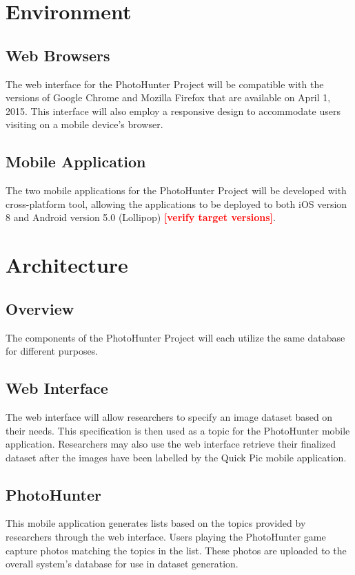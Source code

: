 \documentclass{article}
\newcommand{\todo}[1]{\textcolor{red}{\textbf{[#1]}}}
\begin{document}
\section{Environment}

\subsection{Web Browsers}
The web interface for the PhotoHunter Project will be compatible with the
versions of Google Chrome and Mozilla Firefox that are available on
April 1, 2015. This interface will also employ a
responsive design to accommodate users visiting on a mobile device's browser.

\subsection{Mobile Application}
The two mobile applications for the PhotoHunter Project will be developed with
cross-platform tool, allowing the applications to be deployed to both
iOS version 8 and Android version 5.0 (Lollipop) \todo{verify target
versions}.

\section{Architecture}

\subsection{Overview}
The components of the PhotoHunter Project will each utilize the same database
for different purposes.

\subsection{Web Interface}
The web interface will allow researchers to specify an image dataset based on
their needs. This specification is then used as a topic for the PhotoHunter
mobile application. Researchers may also use the web interface retrieve their
finalized dataset after the images have been labelled by the Quick Pic mobile
application. 

\subsection{PhotoHunter}
This mobile application generates lists based on the topics provided by
researchers through the web interface. Users playing the PhotoHunter game
capture photos matching the topics in the list. These photos are uploaded to
the overall system's database for use in dataset generation.
\end{document}
